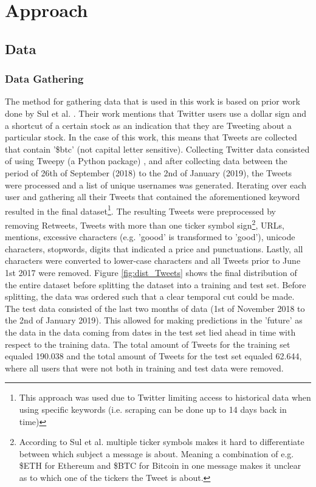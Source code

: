 \documentclass[sigconf]{acmart-txmm}
\begin{document}
\section{Approach}
\label{sec:approach}
\subsection{Data}
\subsubsection{Data Gathering}
\label{sec:data_gath}
The method for gathering data that is used in this work is based on prior work done by Sul et al. \cite{sul2017trading}. Their work mentions that Twitter users use a dollar sign and a shortcut of a certain stock as an indication that they are Tweeting about a particular stock. In the case of this work, this means that Tweets are collected that contain '\$btc' (not capital letter sensitive). Collecting Twitter data consisted of using Tweepy (a Python package) \cite{tweepy_2018}, and after collecting data between the period of 26th of September (2018) to the 2nd of January (2019), the Tweets were processed and a list of unique usernames was generated. Iterating over each user and gathering all their Tweets that contained the aforementioned keyword resulted in the final dataset\footnote{This approach was used due to Twitter limiting access to historical data when using specific keywords (i.e. scraping can be done up to 14 days back in time)}. The resulting Tweets were preprocessed by removing Retweets, Tweets with more than one ticker symbol sign\footnote{According to Sul et al. \cite{sul2017trading} multiple ticker symbols makes it hard to differentiate between which subject a message is about. Meaning a combination of e.g. \$ETH for Ethereum and \$BTC for Bitcoin in one message makes it unclear as to which one of the tickers the Tweet is about.}, URLs, mentions, excessive characters (e.g. 'goood' is transformed to 'good'), unicode characters, stopwords, digits that indicated a price and punctuations. Lastly, all characters were converted to lower-case characters and all Tweets prior to June 1st 2017 were removed. Figure \ref{fig:dist_Tweets} shows the final distribution of the entire dataset before splitting the dataset into a training and test set. Before splitting, the data was ordered such that a clear temporal cut could be made. The test data consisted of the last two months of data (1st of November 2018 to the 2nd of January 2019). This allowed for making predictions in the 'future' as the data in the data coming from dates in the test set lied ahead in time with respect to the training data. The total amount of Tweets for the training set equaled 190.038 and the total amount of Tweets for the test set equaled 62.644, where all users that were not both in training and test data were removed.
\end{document}
